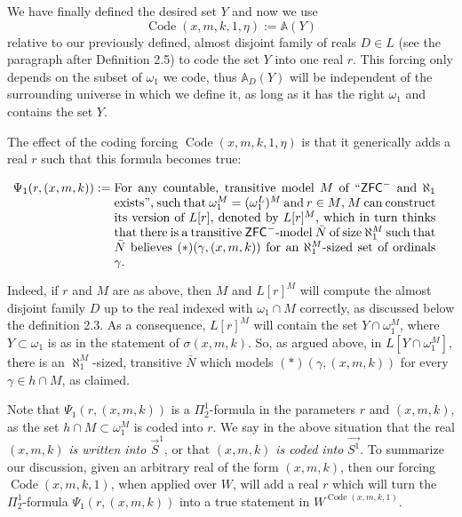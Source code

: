 \documentclass[a4paper,11pt]{article}
\newcommand{\ZFC}{\mathsf{ZFC}}
\begin{document}
We have finally defined the desired set $Y$ and now we use 
\[\operatorname{Code} (x,m,k,1,\eta):= \mathbb{A} (Y) \]
 relative to our previously defined, almost disjoint family of reals $D \in  L $ (see the paragraph after Definition 2.5)  to code the set $Y$ into one real $r$. This forcing only depends on the subset of $\omega_1$ we code, thus $\mathbb{A}_D(Y)$ will be independent of the surrounding universe in which we define it, as long as it has the right $\omega_1$ and contains the set $Y$.

The effect of the coding forcing $\operatorname{Code} (x,m,k,1,\eta)$ is that it generically adds a real $r$ such that
this formula becomes true:



\begin{align*}
\Psi_1 (r, (x,m,k)) := {} & \parbox[t]{0.75\textwidth}{For any countable, transitive model $M$ of ``$\ZFC^-$ and $\aleph_1$ exists'', such that $\omega_1^M=(\omega_1^L)^M$ and $r \in M$, $M$ can construct its version of $L[r]$, denoted by $L[r]^M$, which in turn thinks that there is a transitive $\ZFC^-$-model $\bar{N}$ of size $\aleph_1^M$ such that $\bar{N}$ believes $(\ast)({\gamma,(x,m,k))}$ for an $\aleph_1^M$-sized set of ordinals $\gamma$.}
\end{align*}



Indeed, if $r$ and $M$ are as above, then $M$ and $L[r]^M$ will compute the almost disjoint family $D$ up to the real indexed with $\omega_1 \cap M$ correctly, as discussed below the definition 2.3. As a consequence, $L[r]^M$ will contain the set $Y \cap \omega_1^M$, where $Y \subset \omega_1$ is as in the statement of $\sigma(x,m,k)$. So, as argued above,  in $L[Y \cap \omega_1^M]$, there is an $\aleph_1^M$-sized, transitive $\bar{N}$ which models $(\ast)({\gamma},(x,m,k))$ for every $\gamma \in h \cap M$, as claimed.


Note that $ \Psi_1 (r, (x,m,k))$ is a $\Pi^1_2$-formula in the parameters $r$ and $(x,m,k)$, as the set $h \cap M \subset \omega_1^M$ is coded into $r$. We say in the above situation that the real $(x,m,k)$ \emph{ is written into $\vec{S}^1$}, or that $(x,m,k)$ \emph{is coded into} $\vec{S^1}$. To summarize our discussion, given an arbitrary real of the form $(x,m,k)$, then our forcing $\operatorname{Code} (x,m,k,1)$, when applied over $W$, will add a real $r$ which will turn the $\Pi^1_2$-formula $ \Psi_1 (r, (x,m,k))$ into a true statement in $W^{\operatorname{Code} (x,m,k,1)}$.
\end{document}
